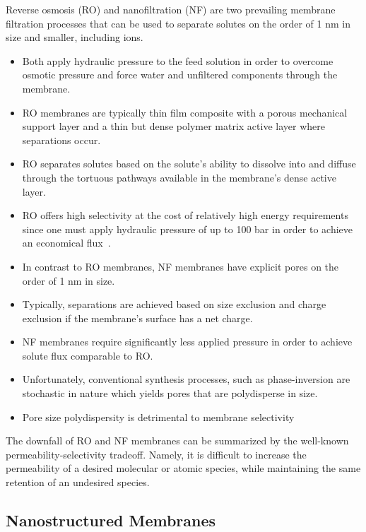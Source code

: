 \documentclass{article}
\begin{document}
  Reverse osmosis (RO) and nanofiltration (NF) are two prevailing membrane
  filtration processes that can be used to separate solutes on the order of
  1 nm in size and smaller, including ions.
  \begin{itemize}  
    \item Both apply hydraulic pressure to the feed solution in order to 
    overcome osmotic pressure and force water and unfiltered components 
    through the membrane.
    \item RO membranes are typically thin film composite with a porous mechanical 
    support layer and a thin but dense polymer matrix active layer where separations
    occur.\cite{jeong_interfacial_2007}
    \item RO separates solutes based on the solute's ability to dissolve into
    and diffuse through the tortuous pathways available in the membrane's dense 
    active layer.
    \item RO offers high selectivity at the cost of relatively high energy 
    requirements since one must apply hydraulic pressure of up to 100 bar in 
    order to achieve an economical flux~\cite{van_der_bruggen_review_2003}.  %
    \item In contrast to RO membranes, NF membranes have explicit pores on the
    order of 1 nm in size. 
    \item Typically, separations are achieved based on size exclusion and
    charge exclusion if the membrane's surface has a net charge.
    \item NF membranes require significantly less applied pressure in order
    to achieve solute flux comparable to RO.
    \item Unfortunately, conventional synthesis processes, such as 
    phase-inversion\cite{smolders_microstructures_1992} are stochastic in
    nature which yields pores that are polydisperse in size.\cite{werber_materials_2016} %
    \item Pore size polydispersity is detrimental to membrane selectivity
  \end{itemize}
  
  The downfall of RO and NF membranes can be summarized by the well-known
  permeability-selectivity tradeoff. Namely, it is difficult to increase the
  permeability of a desired molecular or atomic species, while maintaining
  the same retention of an undesired species.\cite{werber_materials_2016}  
  
  \subsection*{Nanostructured Membranes}
  
\end{document}
